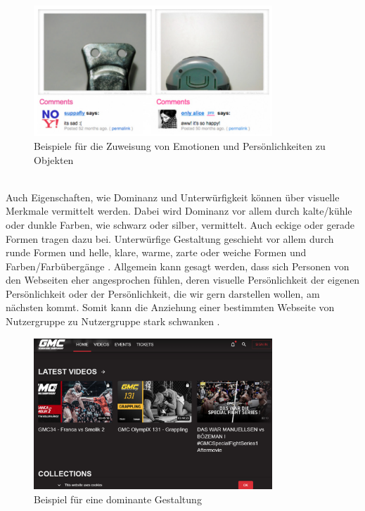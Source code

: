 \documentclass[./dokumentation.tex]{subfiles}
\begin{document}
\begin{figure}[h]
    \centering
    \includegraphics[width=0.8\textwidth]{bilder/sad-happy.png}
    \caption{Beispiele für die Zuweisung von Emotionen und Persönlichkeiten zu Objekten}
    \label{fig6:happy}
\end{figure}\\

Auch Eigenschaften, wie Dominanz und Unterwürfigkeit können über visuelle Merkmale vermittelt werden. Dabei wird Dominanz vor allem durch kalte/kühle oder dunkle Farben, wie schwarz oder silber, vermittelt. Auch eckige oder gerade Formen tragen dazu bei. Unterwürfige Gestaltung geschieht vor allem durch runde Formen und helle, klare, warme, zarte oder weiche Formen und Farben/Farbübergänge \cite{DesignEmo2003}. Allgemein kann gesagt werden, dass sich Personen von den Webseiten eher angesprochen fühlen, deren visuelle Persönlichkeit der eigenen Persönlichkeit oder der Persönlichkeit, die wir gern darstellen wollen, am nächsten kommt. Somit kann die Anziehung einer bestimmten Webseite von Nutzergruppe zu Nutzergruppe stark schwanken \cite{vanGorp2013}. \\

\begin{figure}[h]
    \centering
    \includegraphics[width=0.8\textwidth]{bilder/dom.png}
    \caption{Beispiel für eine dominante Gestaltung \cite{dom_bsp}}
    \label{fig7:dom}
\end{figure}\\
\end{document}
